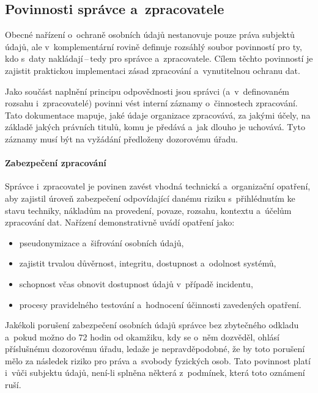 \subsection{Povinnosti správce a~zpracovatele}
Obecné nařízení o~ochraně osobních údajů nestanovuje pouze práva subjektů údajů, ale v~komplementární rovině definuje rozsáhlý soubor povinností pro ty, kdo s~daty nakládají\,--\,tedy pro správce a~zpracovatele.
Cílem těchto povinností je zajistit praktickou implementaci zásad zpracování a~vynutitelnou ochranu dat.

Jako součást naplnění principu odpovědnosti jsou správci (a~v~definovaném rozsahu i~zpracovatelé) povinni vést interní záznamy o~činnostech zpracování.
Tato dokumentace mapuje, jaké údaje organizace zpracovává, za jakými účely, na základě jakých právních titulů, komu je předává a~jak dlouho je uchovává.
Tyto záznamy musí být na vyžádání předloženy dozorovému úřadu.

\paragraph{Zabezpečení zpracování \cite[Článek 32--34]{eu-2016-679}}
Správce i~zpracovatel je povinen zavést vhodná technická a~organizační opatření, aby zajistil úroveň zabezpečení odpovídající danému riziku s~přihlédnutím ke stavu techniky, nákladům na provedení, povaze, rozsahu, kontextu a~účelům zpracování dat.
Nařízení demonstrativně uvádí opatření jako:
\begin{itemize}
    \item pseudonymizace a~šifrování osobních údajů,
    \item zajistit trvalou důvěrnost, integritu, dostupnost a~odolnost systémů,
    \item schopnost včas obnovit dostupnost údajů v~případě incidentu,
    \item procesy pravidelného testování a~hodnocení účinnosti zavedených opatření.
\end{itemize}

Jakékoli porušení zabezpečení osobních údajů správce bez zbytečného odkladu a~pokud možno do 72 hodin od okamžiku, kdy se o~něm dozvěděl, ohlásí příslušnému dozorovému úřadu, ledaže je nepravděpodobné, že by toto porušení mělo za následek riziko pro práva a~svobody fyzických osob.
Tato povinnost platí i~vůči subjektu údajů, není-li splněna některá z~podmínek, která toto oznámení ruší.


